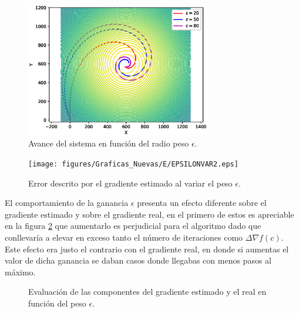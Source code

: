 \begin{figure}[H]
\centering
\includegraphics[width=0.72\textwidth]{figures/Epsilon_variante/Figure_1.eps}
\caption{Avance del sistema en función del radio peso $\epsilon$.} \label{Epsilon_Var}
\end{figure}

\begin{figure}[H]
\centering
\texttt{[image: figures/Graficas\_Nuevas/E/EPSILONVAR2.eps]}
\caption{Error descrito por el gradiente estimado al variar el peso $\epsilon$.} \label{Epsilon_Var_Error}
\end{figure}

El comportamiento de la ganancia $\epsilon$ presenta un efecto diferente sobre el gradiente estimado y sobre el gradiente real, en el primero de estos es apreciable  en la figura \ref{Epsilon_Var_Error} que aumentarlo es perjudicial para el algoritmo dado que conllevaría a elevar en exceso tanto el número de iteraciones como $\Delta{\nabla{f\left(c\right)}}$. Este efecto era justo el contrario con el gradiente real, en donde si aumentas el valor de dicha ganancia se daban casos donde llegabas con menos pasos al máximo.

\begin{figure}[H]
  \begin{center}
    \caption{Evaluación de las componentes del gradiente estimado y el real en función del peso $\epsilon$.}
    \label{Gradiente_Var_Epsilon}
  \end{center}
\end{figure}


